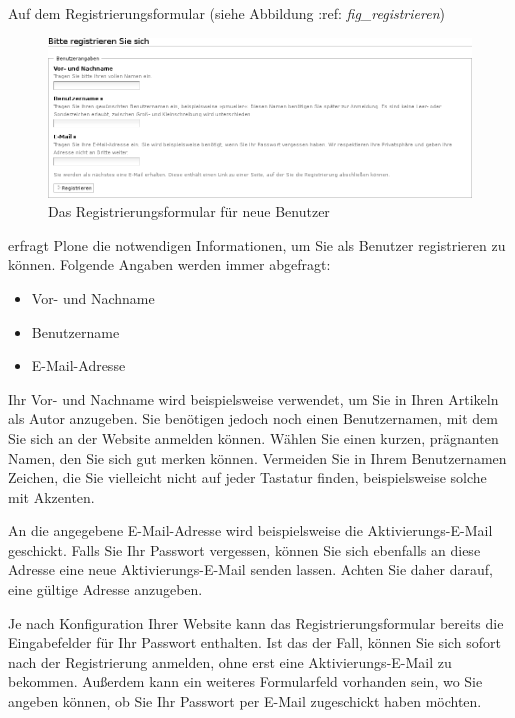 \documentclass[a4paper,12pt,ngerman]{manual}
\begin{document}
Auf dem Registrierungsformular (siehe Abbildung :ref: \emph{fig\_registrieren})
\hypertarget{fig-registrieren}{}\begin{figure}[htbp]
\centering

\includegraphics[width=1.000\linewidth]{registrieren.png}
\caption{Das Registrierungsformular für neue Benutzer}\end{figure}

erfragt Plone die notwendigen Informationen, um Sie als Benutzer registrieren
zu können. Folgende Angaben werden immer abgefragt:
\begin{itemize}
\item {} 
Vor- und Nachname

\item {} 
Benutzername

\item {} 
E-Mail-Adresse

\end{itemize}

Ihr Vor- und Nachname wird beispielsweise verwendet, um Sie in Ihren Artikeln
als Autor anzugeben. Sie benötigen jedoch noch einen Benutzernamen, mit dem
Sie sich an der Website anmelden können. Wählen Sie einen kurzen, prägnanten
Namen, den Sie sich gut merken können. Vermeiden Sie in Ihrem Benutzernamen
Zeichen, die Sie vielleicht nicht auf jeder Tastatur finden, beispielsweise
solche mit Akzenten.

An die angegebene E-Mail-Adresse wird beispielsweise die Aktivierungs-E-Mail
geschickt. Falls Sie Ihr Passwort vergessen, können Sie sich ebenfalls an
diese Adresse eine neue Aktivierungs-E-Mail senden lassen. Achten Sie daher
darauf, eine gültige Adresse anzugeben.

Je nach Konfiguration Ihrer Website kann das Registrierungsformular bereits
die Eingabefelder für Ihr Passwort enthalten. Ist das der Fall, können Sie
sich sofort nach der Registrierung anmelden, ohne erst eine
Aktivierungs-E-Mail zu bekommen. Außerdem kann ein weiteres Formularfeld
vorhanden sein, wo Sie angeben können, ob Sie Ihr Passwort per E-Mail
zugeschickt haben möchten.
\end{document}
